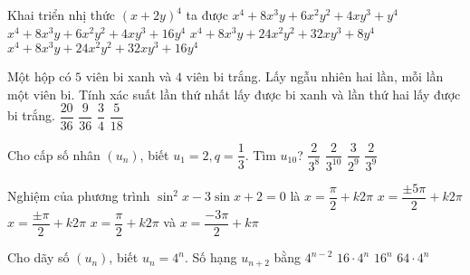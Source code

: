 \begin{ex} %
	Khai triển nhị thức $\left({x+2y}\right)^4$ ta được
\choice
	{$x^4+8x^3y+6x^2y^2+4xy^3+y^4$}
	{$x^4+8x^3y+6x^2y^2+4xy^3+16y^4$}
	{$x^4+8x^3y+24x^2y^2+32xy^3+8y^4$}
	{\True $x^4+8x^3y+24x^2y^2+32xy^3+16y^4$}
\end{ex}
\begin{ex} %
	Một hộp có $5$ viên bi xanh và $4$ viên bi trắng. Lấy ngẫu nhiên hai lần, mỗi lần một viên bi. Tính xác suất lần thứ nhất lấy được bi xanh và lần thứ hai lấy được bi trắng.
	\choice
	{$\dfrac{20}{36}$}
	{$\dfrac{9}{36}$}
	{$\dfrac{3}{4}$}
	{\True $\dfrac{5}{18}$}
\end{ex}
\begin{ex} %
	Cho cấp số nhân $\left({u_n}\right)$, biết $u_1=2,q=\dfrac{1}{3}$. Tìm $u_{10}$?
	\choice
	{$\dfrac{2}{3^8}$}
	{$\dfrac{2}{3^{10}}$}
	{$\dfrac{3}{2^9}$}
	{\True $\dfrac{2}{3^9}$}
\end{ex}
\begin{ex} %
	Nghiệm của phương trình $\sin^2x-3\sin x+2=0$ là
	\choice
	{\True $x=\dfrac{\pi}{2}+k2\pi $}
	{$x=\dfrac{\pm 5\pi}{2}+k2\pi $}
	{$x=\dfrac{\pm \pi}{2}+k2\pi $}
	{$x=\dfrac{\pi}{2}+k2\pi $ và $x=\dfrac{-3\pi}{2}+k\pi $}
\end{ex}
\begin{ex} %
	Cho dãy số $\left({u_n}\right)$, biết $u_n=4^n$. Số hạng $u_{n+2}$ bằng
	\choice
	{$4^{n-2}$}
	{\True $16 \cdot 4^n$}
	{$16^n$}
	{$64 \cdot 4^n$}
\end{ex}
